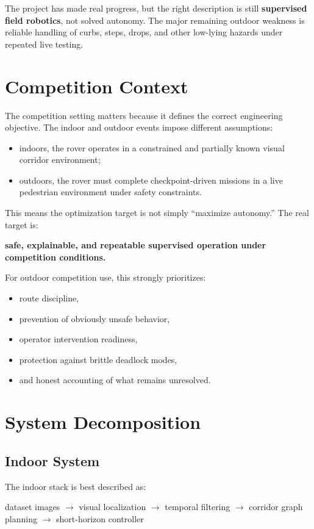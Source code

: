\documentclass[11pt]{article}
\begin{document}
The project has made real progress, but the right description is still \textbf{supervised field robotics}, not solved autonomy. The major remaining outdoor weakness is reliable handling of curbs, steps, drops, and other low-lying hazards under repeated live testing.

\section{Competition Context}
The competition setting matters because it defines the correct engineering objective. The indoor and outdoor events impose different assumptions:
\begin{itemize}[leftmargin=*]
  \item indoors, the rover operates in a constrained and partially known visual corridor environment;
  \item outdoors, the rover must complete checkpoint-driven missions in a live pedestrian environment under safety constraints.
\end{itemize}

This means the optimization target is not simply ``maximize autonomy.'' The real target is:
\begin{center}
\textbf{safe, explainable, and repeatable supervised operation under competition conditions.}
\end{center}

For outdoor competition use, this strongly prioritizes:
\begin{itemize}[leftmargin=*]
  \item route discipline,
  \item prevention of obviously unsafe behavior,
  \item operator intervention readiness,
  \item protection against brittle deadlock modes,
  \item and honest accounting of what remains unresolved.
\end{itemize}

\section{System Decomposition}
\subsection{Indoor System}
The indoor stack is best described as:
\begin{center}
dataset images $\rightarrow$ visual localization $\rightarrow$ temporal filtering $\rightarrow$ corridor graph planning $\rightarrow$ short-horizon controller
\end{center}
\end{document}
